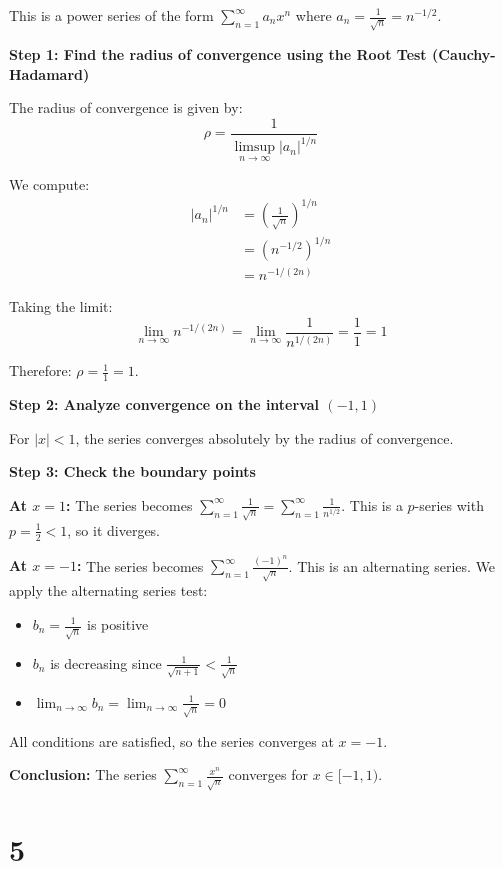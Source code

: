 \documentclass[12pt,a4paper]{article}
\theoremstyle{definition}
\theoremstyle{remark}
\begin{document}
This is a power series of the form $\sum_{n=1}^{\infty} a_n x^n$ where $a_n = \frac{1}{\sqrt{n}} = n^{-1/2}$.

\textbf{Step 1: Find the radius of convergence using the Root Test (Cauchy-Hadamard)}

The radius of convergence is given by:
$$\rho = \frac{1}{\limsup_{n \to \infty} |a_n|^{1/n}}$$

We compute:
\begin{align*}
|a_n|^{1/n} &= \left(\frac{1}{\sqrt{n}}\right)^{1/n} \\
&= \left(n^{-1/2}\right)^{1/n} \\
&= n^{-1/(2n)}
\end{align*}

Taking the limit:
$$\lim_{n \to \infty} n^{-1/(2n)} = \lim_{n \to \infty} \frac{1}{n^{1/(2n)}} = \frac{1}{1} = 1$$

Therefore: $\rho = \frac{1}{1} = 1$.

\textbf{Step 2: Analyze convergence on the interval $(-1,1)$}

For $|x| < 1$, the series converges absolutely by the radius of convergence.

\textbf{Step 3: Check the boundary points}

\textbf{At $x = 1$:}
The series becomes $\sum_{n=1}^{\infty} \frac{1}{\sqrt{n}} = \sum_{n=1}^{\infty} \frac{1}{n^{1/2}}$.
This is a $p$-series with $p = \frac{1}{2} < 1$, so it diverges.

\textbf{At $x = -1$:}
The series becomes $\sum_{n=1}^{\infty} \frac{(-1)^n}{\sqrt{n}}$.
This is an alternating series. We apply the alternating series test:
\begin{itemize}
    \item $b_n = \frac{1}{\sqrt{n}}$ is positive
    \item $b_n$ is decreasing since $\frac{1}{\sqrt{n+1}} < \frac{1}{\sqrt{n}}$
    \item $\lim_{n \to \infty} b_n = \lim_{n \to \infty} \frac{1}{\sqrt{n}} = 0$
\end{itemize}
All conditions are satisfied, so the series converges at $x = -1$.

\textbf{Conclusion:}
The series $\sum_{n=1}^{\infty} \frac{x^n}{\sqrt{n}}$ converges for $x \in [-1, 1)$.



\section*{5}
\end{document}
